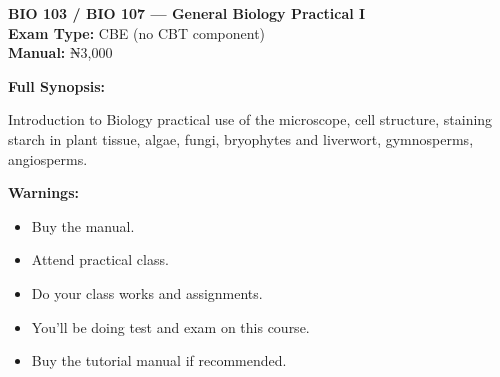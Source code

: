 \documentclass[11pt,a4paper]{article}
\begin{document}
\begin{coursebox}
    \textbf{\color{primary}\Large BIO 103 / BIO 107 --- General Biology Practical I}\\[0.3em]
    \textbf{Exam Type:} CBE (no CBT component) \\
    \textbf{Manual:} ₦3,000

    \vspace{0.8em}

    \textbf{Full Synopsis:}

    Introduction to Biology practical use of the microscope, cell structure, staining starch in plant tissue, algae, fungi, bryophytes and liverwort, gymnosperms, angiosperms.

    \vspace{0.8em}

    \textbf{\color{warningText}Warnings:}
    \begin{itemize}[leftmargin=1.5em, itemsep=0.2em]
        \item Buy the manual.
        \item Attend practical class.
        \item Do your class works and assignments.
        \item You'll be doing test and exam on this course.
        \item Buy the tutorial manual if recommended.
    \end{itemize}
\end{coursebox}
\end{document}
